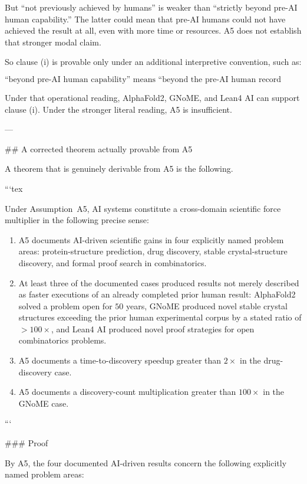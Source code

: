 But “not previously achieved by humans” is weaker than “strictly beyond pre-AI human capability.” The latter could mean that pre-AI humans could not have achieved the result at all, even with more time or resources. A5 does not establish that stronger modal claim.

So clause (i) is provable only under an additional interpretive convention, such as:

\[
\text{“beyond pre-AI human capability” means “beyond the pre-AI human record described in A5.”}
\]

Under that operational reading, AlphaFold2, GNoME, and Lean4 AI can support clause (i). Under the stronger literal reading, A5 is insufficient.

---

## A corrected theorem actually provable from A5

A theorem that is genuinely derivable from A5 is the following.

```tex
\begin{theorem}
  Under Assumption~A5, AI systems constitute a cross-domain scientific
  force multiplier in the following precise sense:
  \begin{enumerate}
    \item[(a)] A5 documents AI-driven scientific gains in four explicitly
      named problem areas: protein-structure prediction, drug discovery,
      stable crystal-structure discovery, and formal proof search in
      combinatorics.
    \item[(b)] At least three of the documented cases produced results not
      merely described as faster executions of an already completed prior
      human result: AlphaFold2 solved a problem open for $50$ years, GNoME
      produced novel stable crystal structures exceeding the prior human
      experimental corpus by a stated ratio of $>100\times$, and Lean4 AI
      produced novel proof strategies for open combinatorics problems.
    \item[(c)] A5 documents a time-to-discovery speedup greater than
      $2\times$ in the drug-discovery case.
    \item[(d)] A5 documents a discovery-count multiplication greater than
      $100\times$ in the GNoME case.
  \end{enumerate}
\end{theorem}
```

### Proof

By A5, the four documented AI-driven results concern the following explicitly named problem areas:

